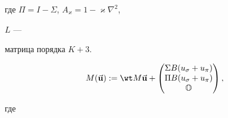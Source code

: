 где $\Pi=I-\Sigma$, $A_\varkappa=1-\varkappa\nabla^2$,


$L$ ---


матрица порядка $K+3$.


\begin{equation}


M(\Vec{\bold u}):=\wt M\Vec{\bold u}+


\begin{pmatrix}


\Sigma B(u_\sigma+u_\pi)\\


\Pi B(u_\sigma+u_\pi)\\


\bo


\end{pmatrix}


,


\end{equation}


где


